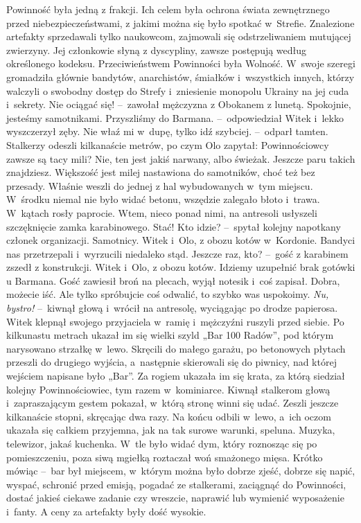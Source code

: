 \documentclass[../MAIN.tex]{subfiles}
\begin{document}
Powinność była jedną z frakcji. Ich celem była ochrona świata zewnętrznego przed niebezpieczeństwami, z jakimi można się było spotkać w~Strefie. Znalezione artefakty sprzedawali tylko naukowcom, zajmowali się odstrzeliwaniem mutującej zwierzyny. Jej członkowie słyną z dyscypliny, zawsze postępują według określonego kodeksu.
\pp
Przeciwieństwem Powinności była Wolność. W~swoje szeregi gromadziła głównie bandytów, anarchistów, śmiałków i~wszystkich innych, którzy walczyli o swobodny dostęp do Strefy i~zniesienie monopolu Ukrainy na jej cuda i~sekrety.
\sx Nie ociągać się! --~zawołał mężczyzna z Obokanem z lunetą.
\xx Spokojnie, jesteśmy samotnikami. Przyszliśmy do Barmana. --~odpowiedział Witek i~lekko wyszczerzył zęby.
\xx Nie właź mi w~dupę, tylko idź szybciej. --~odparł tamten.
\qd
Stalkerzy odeszli kilkanaście metrów, po czym Olo zapytał:
\sx Powinnościowcy zawsze są tacy mili?
\xx Nie, ten jest jakiś narwany, albo świeżak. Jeszcze paru takich znajdziesz. Większość jest milej nastawiona do samotników, choć też bez przesady.
\qd
\hspace{28.1em}Właśnie weszli do jednej z hal wybudowanych w~tym miejscu. W~środku niemal nie było widać betonu, wszędzie zalegało błoto i~trawa. W~kątach rosły paprocie. Wtem, nieco ponad nimi, na antresoli usłyszeli szczęknięcie zamka karabinowego.
\sx Stać! Kto idzie? --~spytał kolejny napotkany członek organizacji.
\xx Samotnicy. Witek i~Olo, z obozu kotów w~Kordonie. Bandyci nas przetrzepali i~wyrzucili niedaleko stąd.
\xx Jeszcze raz, kto? --~gość z karabinem zszedł z konstrukcji.
\xx Witek i~Olo, z obozu kotów. Idziemy uzupełnić brak gotówki u Barmana.
\qm
Gość zawiesił broń na plecach, wyjął notesik i~coś zapisał.
\sx Dobra, możecie iść. Ale tylko spróbujcie coś odwalić, to szybko was uspokoimy. \textit{Nu, bystro!} --~kiwnął głową i~wrócił na antresolę, wyciągając po drodze papierosa.
\qm
Witek klepnął swojego przyjaciela w~ramię i~mężczyźni ruszyli przed siebie. Po kilkunastu metrach ukazał im się wielki szyld „Bar 100 Radów”, pod którym narysowano strzałkę w~lewo. Skręcili do małego garażu, po betonowych płytach przeszli do drugiego wyjścia, a~następnie skierowali się do piwnicy, nad której wejściem napisane było „Bar”. Za rogiem ukazała im się krata, za którą siedział kolejny Powinnościowiec, tym razem w~kominiarce. Kiwnął stalkerom głową i~zapraszającym gestem pokazał, w~którą stronę winni się udać.
\pp
Zeszli jeszcze kilkanaście stopni, skręcając dwa razy. Na końcu odbili w~lewo, a~ich oczom ukazała się całkiem przyjemna, jak na tak surowe warunki, speluna. Muzyka, telewizor, jakaś kuchenka. W~tle było widać dym, który roznosząc się po pomieszczeniu, poza siwą mgiełką roztaczał woń smażonego mięsa. Krótko mówiąc --~bar był miejscem, w~którym można było dobrze zjeść, dobrze się napić, wyspać, schronić przed emisją, pogadać ze stalkerami, zaciągnąć do Powinności, dostać jakieś ciekawe zadanie czy wreszcie, naprawić lub wymienić wyposażenie i~fanty. A ceny za artefakty były dość wysokie.
\end{document}

